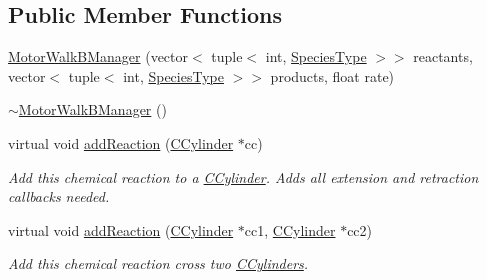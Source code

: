\subsection*{Public Member Functions}
\begin{DoxyCompactItemize}
\item 
\hyperlink{classMotorWalkBManager_ac056cd351052a263ed589331c96fd5cc}{Motor\+Walk\+B\+Manager} (vector$<$ tuple$<$ int, \hyperlink{Species_8h_a50651af47c56ea0e27235468d23542cf}{Species\+Type} $>$$>$ reactants, vector$<$ tuple$<$ int, \hyperlink{Species_8h_a50651af47c56ea0e27235468d23542cf}{Species\+Type} $>$$>$ products, float rate)
\item 
\hyperlink{classMotorWalkBManager_a621f7f8abf76ba55f465811067424039}{$\sim$\+Motor\+Walk\+B\+Manager} ()
\item 
virtual void \hyperlink{classMotorWalkBManager_a51f22756649c1d14a1d516ee8501024a}{add\+Reaction} (\hyperlink{classCCylinder}{C\+Cylinder} $\ast$cc)
\begin{DoxyCompactList}\small\item\em Add this chemical reaction to a \hyperlink{classCCylinder}{C\+Cylinder}. Adds all extension and retraction callbacks needed. \end{DoxyCompactList}\item 
virtual void \hyperlink{classMotorWalkBManager_aeab62b307495c7791c14b213aa93073e}{add\+Reaction} (\hyperlink{classCCylinder}{C\+Cylinder} $\ast$cc1, \hyperlink{classCCylinder}{C\+Cylinder} $\ast$cc2)
\begin{DoxyCompactList}\small\item\em Add this chemical reaction cross two \hyperlink{classCCylinder}{C\+Cylinders}. \end{DoxyCompactList}\end{DoxyCompactItemize}
